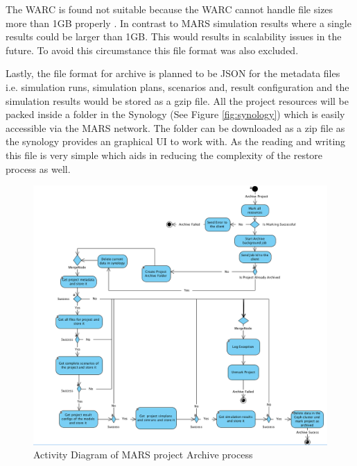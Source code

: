     The WARC is found not suitable because the WARC cannot handle file sizes more than 1GB properly \cite[Appendix B]{WARC}. 
    In contrast to MARS simulation results where a single results could be larger than 1GB. This would results in scalability issues in the future. To 
    avoid this circumstance this file format was also excluded.

    Lastly, the file format for archive is planned to be JSON for the metadata files i.e. simulation runs, simulation plans, scenarios and, result configuration and 
    the simulation results would be stored as a gzip file. All the project resources will be packed inside a folder in the Synology (See Figure \ref{fig:synology})
     which is easily accessible via the MARS network.
    The folder can be downloaded as a zip file as the synology provides an graphical UI to work with. As the reading and writing this file is very simple which
    aids in reducing the complexity of the restore process as well.

\begin{figure}[H]
    \centering \includegraphics[scale=0.45]{grafiken/archiveActivity.png}
    \caption{Activity Diagram of MARS project Archive process}
    \label{fig:archiveActivity}
\end{figure}

